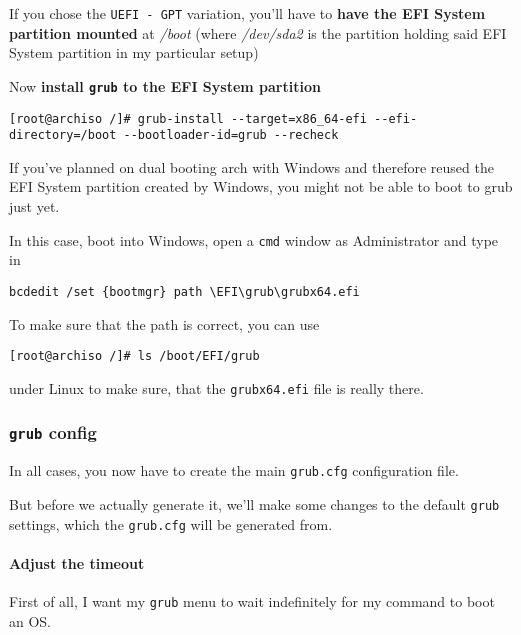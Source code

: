 \documentclass[10pt]{dustdoc}
\begin{document}
If you chose the \texttt{UEFI - GPT} variation, you’ll have to \textbf{have the EFI System partition mounted} at \textit{/boot} (where \textit{/dev/sda2} is the partition holding said EFI System partition in my particular setup)

Now \textbf{install \texttt{grub} to the EFI System partition}

\begin{verbatim}
[root@archiso /]# grub-install --target=x86_64-efi --efi-directory=/boot --bootloader-id=grub --recheck
\end{verbatim}

\begin{IMPORTANT}
    If you’ve planned on dual booting arch with Windows and therefore reused the EFI System partition created by Windows, you might not be able to boot to grub just yet.

    In this case, boot into Windows, open a \texttt{cmd} window as Administrator and type in

    \begin{verbatim}
bcdedit /set {bootmgr} path \EFI\grub\grubx64.efi
    \end{verbatim}

    To make sure that the path is correct, you can use

    \begin{verbatim}
[root@archiso /]# ls /boot/EFI/grub
    \end{verbatim}

    \noindent
    under Linux to make sure, that the \texttt{grubx64.efi} file is really there.
\end{IMPORTANT}

\subsubsection{\texttt{grub} config}
\label{sec:grub-config}

In all cases, you now have to create the main \texttt{grub.cfg} configuration file.

But before we actually generate it, we’ll make some changes to the default \texttt{grub} settings, which the \texttt{grub.cfg} will be generated from.

\paragraph{Adjust the timeout}
\label{par:adjust-the-timeout}

First of all, I want my \texttt{grub} menu to wait indefinitely for my command to boot an OS.
\end{document}

